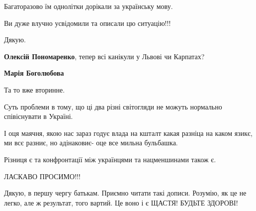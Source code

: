 \begin{itemize}
Багаторазово їм однолітки дорікали за українську мову.

Ви дуже влучно усвідомили та описали цю ситуацію!!!

Дякую.

\begin{itemize}
 
\textbf{Олексій Пономаренко}, тепер всі канікули у Львові чи Карпатах?

 
\textbf{Марія Боголюбова} 

Та то вже вторинне.

Суть проблеми в тому, що ці два різні світогляди не можуть нормально
співіснувати в Україні.

І оця маячня, якою нас зараз годує влада на кшталт какая разніца на каком
язикє, ми всє разниє, но адінаковиє- оце все мильна бульбашка.

Різниця є та конфронтації між українцями та нацменшинами також є.
\end{itemize}

 
ЛАСКАВО ПРОСИМО!!!

 
Дякую, в першу чергу батькам. Приємно читати такі дописи. Розумію, як це не
легко, але ж результат, того вартий. Це воно і є ЩАСТЯ! БУДЬТЕ ЗДОРОВІ!

 

\end{itemize}
